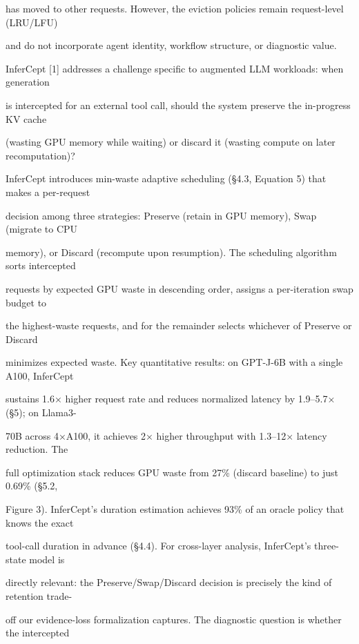 \begin{flushleft}
\noindent has moved to other requests. However, the eviction policies remain request-level (LRU/LFU)\par
\noindent and do not incorporate agent identity, workflow structure, or diagnostic value.\par
\noindent  InferCept [1] addresses a challenge specific to augmented LLM workloads: when generation\par
\noindent is intercepted for an external tool call, should the system preserve the in-progress KV cache\par
\noindent (wasting GPU memory while waiting) or discard it (wasting compute on later recomputation)?\par
\noindent InferCept introduces min-waste adaptive scheduling (§4.3, Equation 5) that makes a per-request\par
\noindent decision among three strategies: Preserve (retain in GPU memory), Swap (migrate to CPU\par
\noindent memory), or Discard (recompute upon resumption). The scheduling algorithm sorts intercepted\par
\noindent requests by expected GPU waste in descending order, assigns a per-iteration swap budget to\par
\noindent the highest-waste requests, and for the remainder selects whichever of Preserve or Discard\par
\noindent minimizes expected waste. Key quantitative results: on GPT-J-6B with a single A100, InferCept\par
\noindent sustains 1.6× higher request rate and reduces normalized latency by 1.9–5.7× (§5); on Llama3-\par
\noindent 70B across 4×A100, it achieves 2× higher throughput with 1.3–12× latency reduction. The\par
\noindent full optimization stack reduces GPU waste from 27\% (discard baseline) to just 0.69\% (§5.2,\par
\noindent Figure 3). InferCept’s duration estimation achieves 93\% of an oracle policy that knows the exact\par
\noindent tool-call duration in advance (§4.4). For cross-layer analysis, InferCept’s three-state model is\par
\noindent directly relevant: the Preserve/Swap/Discard decision is precisely the kind of retention trade-\par
\noindent off our evidence-loss formalization captures. The diagnostic question is whether the intercepted\par

\end{flushleft}
